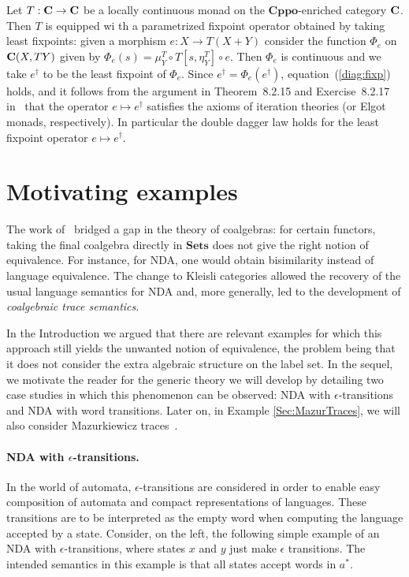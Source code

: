 \documentclass[oribibl,envcountsame,envcountsect,runningheads]{llncs}
\newcommand{\cat}[1]{\ensuremath{\mathbf{#1}}}
\newcommand{\Cat}[1]{\ensuremath{\mathbf{#1}}}
\newcommand{\Sets}{\Cat{Sets}}
\newcommand{\cppo}{\cat{Cppo}}
\renewcommand{\>}{\rangle}
\def\refeq#1{(\ref{#1})}
\def\lsol#1{{#1}^\dag} \def\gensol#1{{#1}^\dag} \def\ssol#1{{#1}^{\star}} \def\cansol#1{{#1}^\dag}
\begin{document}
\begin{example}\label{ex:LfpSolCPO}
  Let $T: \C \to \C$ be a locally continuous monad on the \cppo-enriched category $\C$. Then $T$ is equipped wi th a parametrized fixpoint operator obtained by taking least fixpoints: given a morphism $e: X \to
  T(X+Y)$ consider the function $\Phi_e$ on $\C(X,TY)$ given by $\Phi_e(s) = \mu^T_Y \circ T[s,\eta^T_Y] \circ e$. Then $\Phi_e$ is continuous and we take $\lsol e$ to be the least fixpoint of $\Phi_e$. Since $\lsol e= \Phi_e(\lsol e)$, equation~\refeq{diag:fixp} holds, and it follows from the argument in Theorem~8.2.15 and Exercise~8.2.17 in~\cite{be93} that the operator $e \mapsto \lsol e$ satisfies the axioms of iteration theories (or Elgot monads, respectively). In particular the double dagger law holds for the least fixpoint operator $e \mapsto \lsol e$.
\end{example}

\section{Motivating examples}\label{SSec:Mot}

The work of~\cite{HasuoJS:07} bridged a gap in the theory of coalgebras: for certain functors, taking the final coalgebra directly in $\Sets$ does not give the right notion of equivalence. For instance, for NDA, one would obtain bisimilarity instead of language equivalence. The change to Kleisli categories allowed the recovery of the usual language semantics for NDA and, more generally, led to the development of \emph{coalgebraic trace semantics}.


In the Introduction we argued that there are relevant examples for which this approach still yields the unwanted notion of equivalence, the problem being that it does not consider the extra algebraic structure on the label set. In the sequel, we motivate the reader for the generic theory we will develop by detailing two case studies in which this phenomenon can be observed: NDA with $\epsilon$-transitions and NDA with word transitions. Later on, in Example \ref{Sec:MazurTraces}, we will also consider Mazurkiewicz traces~\cite{Mazurkiewicz77}.

\paragraph{NDA with $\epsilon$-transitions.} In the world of automata, $\epsilon$-transitions are considered in order to enable easy composition of automata and compact representations of languages. These transitions are to be interpreted as the empty word when computing the language accepted by a state. Consider, on the left, the following simple example of an NDA with $\epsilon$-transitions, where states $x$ and $y$ just make $\epsilon$ transitions. The intended semantics in this example is that  all states accept words in $a^*$.
\end{document}
